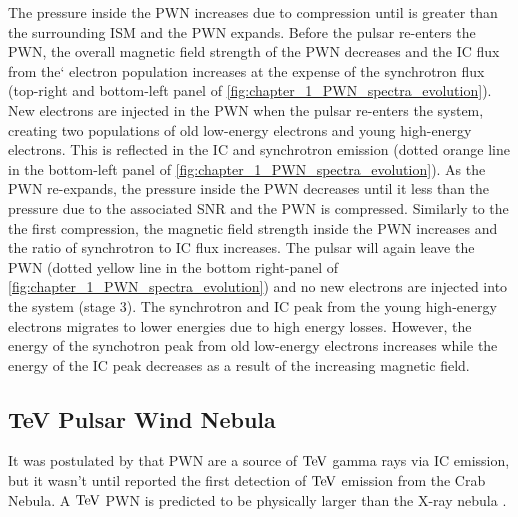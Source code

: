 \newpar
The pressure inside the PWN increases due to compression until is greater than the surrounding ISM and the PWN expands. Before the pulsar re-enters the PWN, the overall magnetic field strength of the PWN decreases and the IC flux from the`  electron population increases at the expense of the synchrotron flux (top-right and bottom-left panel of \autoref{fig:chapter_1_PWN_spectra_evolution}). New electrons are injected in the PWN when the pulsar re-enters the system, creating two populations of old low-energy electrons and young high-energy electrons. This is reflected in the IC and synchrotron emission (dotted orange line in the bottom-left panel of \autoref{fig:chapter_1_PWN_spectra_evolution}).
\newpar
As the PWN re-expands, the pressure inside the PWN decreases until it less than the pressure due to the associated SNR and the PWN is compressed. Similarly to the the first compression, the magnetic field strength inside the PWN increases and the ratio of synchrotron to IC flux increases. The pulsar will again leave the PWN (dotted yellow line in the bottom right-panel of \autoref{fig:chapter_1_PWN_spectra_evolution}) and no new electrons are injected into the system (stage 3). The synchrotron and IC peak from the young high-energy electrons migrates to lower energies due to high energy losses. However, the energy of the synchotron peak from old low-energy electrons increases while the energy of the IC peak decreases as a result of the increasing magnetic field.

\subsection{TeV Pulsar Wind Nebula} \label{sec:01_PWN_TeVPWN}

It was postulated by \cite{1965PhRvL..15..577G} that PWN are a source of $\TeV$ gamma rays via IC emission, but it wasn't until \cite{1989ApJ...342..379W} reported the first detection of $\TeV$ emission from the Crab Nebula. A $\TeV$ PWN is predicted to be physically larger than the X-ray nebula \citep{1997MNRAS.291..162A}.

